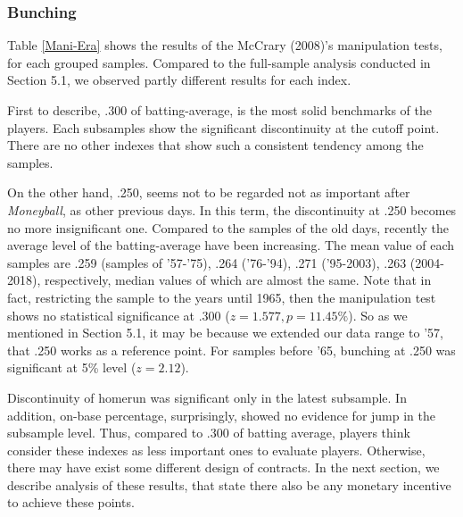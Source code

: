 \documentclass[dvipdfmx, 12pt]{article}
\begin{document}
\subsubsection{Bunching}

Table \ref{Mani-Era} shows the results of the McCrary (2008)'s manipulation tests, for each grouped samples. Compared to the full-sample analysis conducted in Section 5.1, we observed partly different results for each index.

First to describe, .300 of batting-average, is the most solid benchmarks of the players. Each subsamples show the significant discontinuity at the cutoff point. There are no other indexes that show such a consistent tendency among the samples.


On the other hand, .250, seems not to be regarded not as important  after \textit{Moneyball}, as other previous days. In this term, the discontinuity at .250 becomes no more insignificant one. Compared to the samples of the old days, recently the average level of the batting-average have been increasing. The mean value of each samples are .259 (samples of '57-'75), .264 ('76-'94), .271 ('95-2003), .263 (2004-2018), respectively, median values of which are almost the same. Note that in fact, restricting the sample to the years until 1965, then the manipulation test shows no statistical significance at .300 ($z = 1.577, p = 11.45\% $). So as we mentioned in Section 5.1, it may be because we extended our data range to '57, that .250 works as a reference point. For samples before '65, bunching at .250 was significant at 5\% level ($z = 2.12$).

Discontinuity of homerun was significant only in the latest subsample. In addition, on-base percentage, surprisingly, showed no evidence for jump in the subsample level. Thus, compared to .300 of batting average, players think consider these indexes as less important ones to evaluate players. Otherwise, there may have exist some different design of contracts. In the next section, we describe analysis of these results, that state there also be any monetary incentive to achieve these points.
\end{document}

